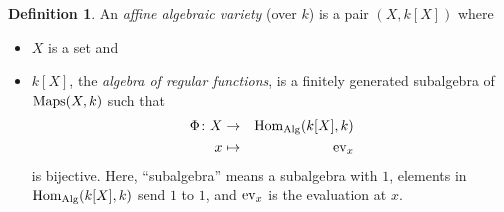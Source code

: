 \documentclass[12pt,a4paper]{scrartcl}
\theoremstyle{cplain}
\theoremstyle{cplain}
\theoremstyle{cplain}
\theoremstyle{definition}
\newtheorem*{deff}{Definition}
\begin{document}
\begin{otherlanguage}{english}
\begin{deff}
  An \emph{affine algebraic variety} (over $k$) is a pair $(X,k[X])$ where
  \begin{itemize}
    \item $X$ is a set and
    \item $k[X]$, the \emph{algebra of regular functions}, is a finitely generated subalgebra of $\operatorname{Maps}(X,k)$ such that
      \begin{eqnarray*}
        \Phi\colon X &\to& \operatorname{Hom}_{\operatorname{Alg}}(k[X],k) \\
        x &\mapsto& \operatorname{ev}_x
      \end{eqnarray*}
      is bijective. Here, \enquote{subalgebra} means a subalgebra with $1$, elements in $\operatorname{Hom}_{\operatorname{Alg}}(k[X],k)$ send $1$ to $1$, and $\operatorname{ev}_x$ is the evaluation at $x$.
  \end{itemize}
\end{deff}


\end{otherlanguage}
\end{document}
